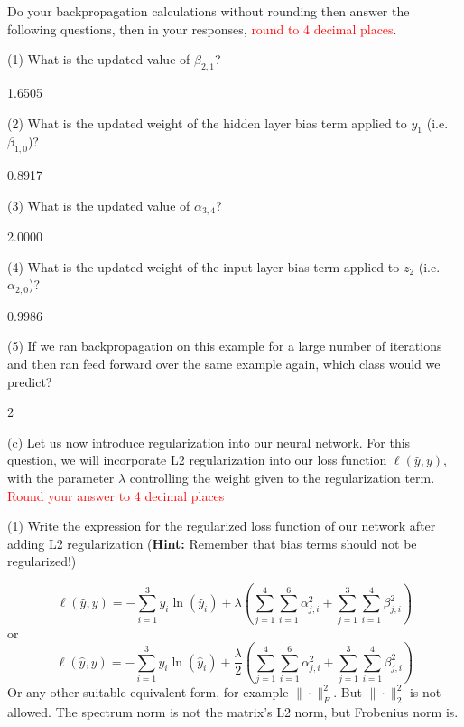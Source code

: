 Do your backpropagation calculations without rounding then answer the following questions, then in your responses, \textcolor{red}{round to 4 decimal places}.

(1) What is the updated value of ${\beta}_{2,1}$?
\begin{tcolorbox}[fit,height=1cm, width=2cm, blank, borderline={1pt}{-2pt}]
1.6505
\end{tcolorbox}

(2) What is the updated weight of the hidden layer bias term applied to $y_1$ (i.e. ${\beta}_{1,0}$)?
\begin{tcolorbox}[fit,height=1cm, width=2cm, blank, borderline={1pt}{-2pt}]
0.8917
\end{tcolorbox}

(3) What is the updated value of ${\alpha}_{3,4}$?
\begin{tcolorbox}[fit,height=1cm, width=2cm, blank, borderline={1pt}{-2pt}]
2.0000
\end{tcolorbox}

(4) What is the updated weight of the input layer bias term applied to $z_2$ (i.e. ${\alpha}_{2,0}$)?
\begin{tcolorbox}[fit,height=1cm, width=2cm, blank, borderline={1pt}{-2pt}]
0.9986
\end{tcolorbox}

(5) If we ran backpropagation on this example for a large number of iterations and then ran feed forward over the same example again, which class would we predict?
\begin{tcolorbox}[fit,height=1cm, width=2cm, blank, borderline={1pt}{-2pt}]
2
\end{tcolorbox}



(c)  Let us now introduce regularization into our neural network. For this question, we will incorporate L2 regularization into our loss function $\ell(\hat{y},y)$, with the parameter $\lambda$ controlling the weight given to the regularization term. \textcolor{red}{Round your answer to 4 decimal places}

(1) Write the expression for the regularized loss function of our network after adding L2 regularization (\textbf{Hint:} Remember that bias terms should not be regularized!)
\begin{tcolorbox}[fit,height=3cm, width=10cm, blank, borderline={1pt}{-2pt}]
$$\ell(\hat{y},y) = -\sum_{i=1}^3 y_i \ln(\hat{y}_i) + \lambda\left(\sum_{j=1}^4 \sum_{i=1}^6 \alpha_{j,i}^2 + \sum_{j=1}^3 \sum_{i=1}^4 \beta_{j,i}^2\right)$$
or
$$\ell(\hat{y},y) = -\sum_{i=1}^3 y_i \ln(\hat{y}_i) + \dfrac{\lambda}{2}\left(\sum_{j=1}^4 \sum_{i=1}^6 \alpha_{j,i}^2 + \sum_{j=1}^3 \sum_{i=1}^4 \beta_{j,i}^2\right)$$
Or any other suitable equivalent form, for example $\|\cdot\|_F^2$. But $\|\cdot\|_2^2$ is not allowed. The spectrum norm is not the matrix's L2 norm, but Frobenius norm is.
\end{tcolorbox}


